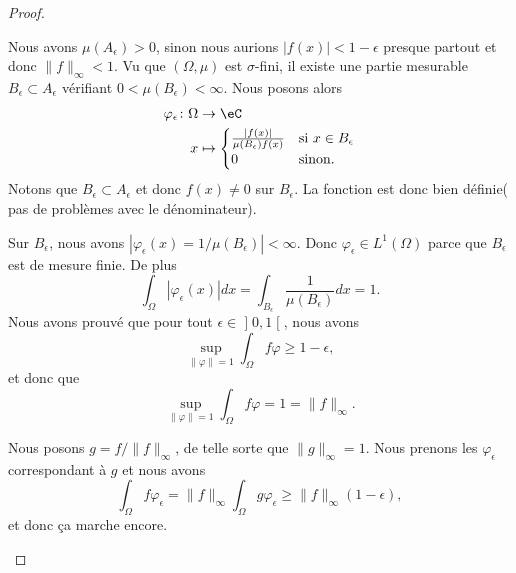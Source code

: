 \begin{proof}
\begin{subproof}
		\begin{subproof}
			\spitem[Si \( \| f \|_{\infty}=1\)]
			Nous avons \( \mu(A_{\epsilon})>0\), sinon nous aurions \( | f(x) |<1-\epsilon\) presque partout et donc \( \| f \|_{\infty}<1\). Vu que \( (\Omega,\mu)  \) est \( \sigma\)-fini, il existe une partie mesurable \( B_{\epsilon}\subset A_{\epsilon}\) vérifiant \( 0<\mu(B_{\epsilon})<\infty\). Nous posons alors
			\begin{equation}
				\begin{aligned}
					\varphi_{\epsilon}\colon \Omega & \to \eC                                                                                 \\
					x                               & \mapsto \begin{cases}
						                                          \frac{ | f(x) | }{ \mu(B_{\epsilon})f(x) } & \text{si } x\in B_{\epsilon} \\
						                                          0                                          & \text{sinon. }
					                                          \end{cases}
				\end{aligned}
			\end{equation}
			Notons que \( B_{\epsilon}\subset A_{\epsilon}\) et donc \( f(x)\neq 0\) sur \( B_{\epsilon}\). La fonction est donc bien définie( pas de problèmes avec le dénominateur).

			Sur \( B_{\epsilon}\), nous avons \( | \varphi_{\epsilon}(x)=1/\mu(B_{\epsilon}) |<\infty\). Donc \( \varphi_{\epsilon}\in L^1(\Omega)\) parce que \( B_{\epsilon}\) est de mesure finie. De plus
			\begin{equation}
				\int_{\Omega}| \varphi_{\epsilon}(x) |dx=\int_{B_{\epsilon}}\frac{1}{ \mu(B_{\epsilon})}dx=1.
			\end{equation}
			Nous avons prouvé que pour tout \( \epsilon\in \mathopen] 0,1\mathclose[\), nous avons
			\begin{equation}
				\sup_{\| \varphi \|=1}\int_{\Omega}f\varphi\geq 1-\epsilon,
			\end{equation}
			et donc que
			\begin{equation}
				\sup_{\| \varphi \|=1}\int_{\Omega}f\varphi=1=\| f \|_{\infty}.
			\end{equation}
		\end{subproof}

		Nous posons \( g=f/\| f \|_{\infty}\), de telle sorte que \( \| g \|_{\infty}=1\). Nous prenons les \( \varphi_{\epsilon}\) correspondant à \( g\) et nous avons
		\begin{equation}
			\int_{\Omega}f\varphi_{\epsilon}=\| f \|_{\infty}\int_{\Omega}g\varphi_{\epsilon}\geq \| f \|_{\infty}(1-\epsilon),
		\end{equation}
		et donc ça marche encore.
	\end{subproof}
\end{proof}

